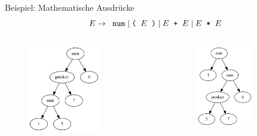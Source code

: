 \documentclass{beamer}
\begin{document}
\begin{frame}{Beispiel: Mathematische Ausdrücke}
	\begin{equation*}
		E \to \;\; \textrm{\texttt{num}} \mid \textrm{\texttt{(}} \;\; E \;\; \textrm{\texttt{)}}
		 \mid E \;\; \textrm{\texttt{+}} \;\; E
		 \mid E \;\; \textrm{\texttt{*}} \;\; E
	\end{equation*}

	\pause

	\begin{columns}
		\begin{column}{0.5\textwidth}
			\begin{figure}
				\includegraphics[width=0.65\textwidth]{images/baumstruktur2.png}
			\end{figure}
		\end{column}
		\begin{column}{0.5\textwidth}
			\begin{figure}
				\includegraphics[width=0.65\textwidth]{images/baumstruktur.png}
			\end{figure}
		\end{column}
	\end{columns}


\end{frame}
\end{document}

